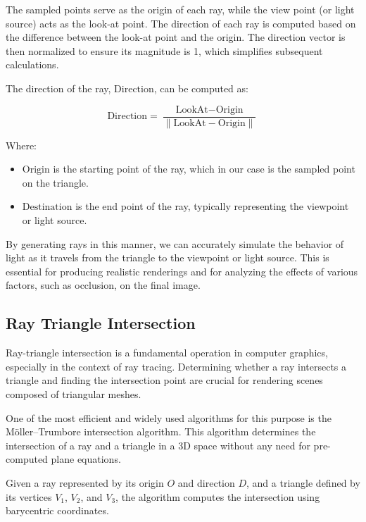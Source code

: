 \documentclass[11pt, a4paper,oneside,chapterprefix=false]{scrbook}
\begin{document}
The sampled points serve as the origin of each ray, while the view point (or light source) acts as the look-at point. The direction of each ray is computed based on the difference between the look-at point and the origin. The direction vector is then normalized to ensure its magnitude is 1, which simplifies subsequent calculations.

The direction of the ray, \( \text{Direction} \), can be computed as:

\begin{equation}
	\text{Direction} = \frac{\text{LookAt} - \text{Origin}}{\|\text{LookAt} - \text{Origin}\|}
\end{equation}

Where:
\begin{itemize}
    \item \(\text{Origin}\) is the starting point of the ray, which in our case is the sampled point on the triangle.
    \item \(\text{Destination}\) is the end point of the ray, typically representing the viewpoint or light source.
\end{itemize}

By generating rays in this manner, we can accurately simulate the behavior of light as it travels from the triangle to the viewpoint or light source. This is essential for producing realistic renderings and for analyzing the effects of various factors, such as occlusion, on the final image.


\subsection{Ray Triangle Intersection}

Ray-triangle intersection is a fundamental operation in computer graphics, especially in the context of ray tracing. Determining whether a ray intersects a triangle and finding the intersection point are crucial for rendering scenes composed of triangular meshes.

One of the most efficient and widely used algorithms for this purpose is the Möller–Trumbore intersection algorithm. This algorithm determines the intersection of a ray and a triangle in a 3D space without any need for pre-computed plane equations.

Given a ray represented by its origin \( O \) and direction \( D \), and a triangle defined by its vertices \( V_1 \), \( V_2 \), and \( V_3 \), the algorithm computes the intersection using barycentric coordinates.
\end{document}
